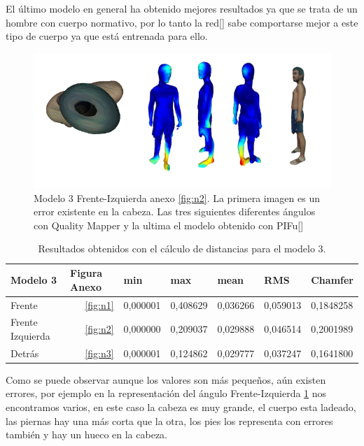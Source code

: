 El último modelo en general ha obtenido mejores resultados ya que se trata de un hombre con cuerpo normativo, por lo tanto la red[\cite{pifu}] sabe comportarse mejor a este tipo de cuerpo ya que está entrenada para ello.

\begin{figure}[H]
	\centering
	\includegraphics[scale=0.5]{imagenes/nahuelado.png}
	\caption{Modelo 3 Frente-Izquierda anexo \ref{fig:n2}. La primera imagen es un error existente en la cabeza. Las tres siguientes diferentes ángulos con Quality Mapper y la ultima el modelo obtenido con PIFu[\cite{pifu}]}
	\label{fig:nahuelado}
\end{figure}

\begin{table}[H]
	
	\begin{tabular}{l|rrrrrl}
		Modelo 3         & \multicolumn{1}{l}{Figura Anexo} & \multicolumn{1}{l}{min} & \multicolumn{1}{l}{max} & \multicolumn{1}{l}{mean} & \multicolumn{1}{l}{RMS} & Chamfer    \\ 
		\hline
		Frente           &   \ref{fig:n1}                   & 0,000001                & 0,408629                & 0,036266                 & 0,059013                & 0,1848258  \\
		Frente Izquierda &   \ref{fig:n2}                   & 0,000000                & 0,209037                & 0,029888                 & 0,046514                & 0,2001989  \\
		Detrás		     &   \ref{fig:n3}                   & 0,000001                & 0,124862                & 0,029777                 & 0,037247                & 0,1641800  
	\end{tabular}
	\caption{Resultados obtenidos con el cálculo de distancias para el modelo 3.}
	\label{tablanahuel}	
\end{table}
\FloatBarrier

Como se puede observar aunque los valores son más pequeños, aún existen errores, por ejemplo en la representación del ángulo Frente-Izquierda \ref{fig:nahuelado} nos encontramos varios, en este caso la cabeza es muy grande, el cuerpo esta ladeado, las piernas hay una más corta que la otra, los pies los representa con errores también y hay un hueco en la cabeza. 

